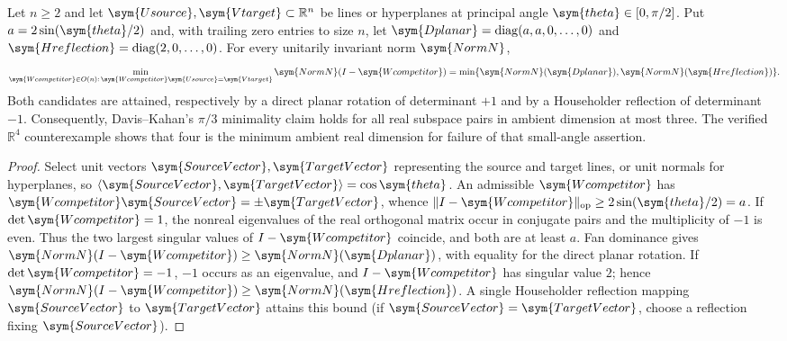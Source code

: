\ifincludeUnformalizedRealTransport
\begin{tcolorbox}[
 enhanced,breakable,colback=white,colframe=red!80!black,
 colbacktitle=red!6!white,coltitle=red!80!black,
 title={Working extension --- real rank-one and codimension-one transport},
 fonttitle=\bfseries,boxrule=1pt,
 left=9pt,right=9pt,top=9pt,bottom=9pt,
 before skip=12pt,after skip=12pt]
\begin{proposition}
Let $n\geq2$ and let $\sym{Usource},\sym{Vtarget}\subset\mathbb R^n$ be lines or hyperplanes
at principal angle $\sym{theta}\in[0,\pi/2]$. Put
$a=2\sin(\sym{theta}/2)$ and, with trailing zero entries to size $n$, let
$\sym{Dplanar}=\operatorname{diag}(a,a,0,\ldots,0)$ and
$\sym{Hreflection}=\operatorname{diag}(2,0,\ldots,0)$. For every unitarily invariant
norm $\sym{NormN}$,
\[
  \min_{\sym{Wcompetitor}\in O(n):\,\sym{Wcompetitor}\sym{Usource}=\sym{Vtarget}} \sym{NormN}(I-\sym{Wcompetitor})
    =\min\{\sym{NormN}(\sym{Dplanar}),\sym{NormN}(\sym{Hreflection})\}.
\]
Both candidates are attained, respectively by a direct planar rotation
of determinant $+1$ and by a Householder reflection of determinant $-1$.
Consequently, Davis--Kahan's $\pi/3$ minimality claim holds for all
real subspace pairs in ambient dimension at most three. The verified
$\mathbb R^4$ counterexample shows that four is the minimum ambient
real dimension for failure of that small-angle assertion.
\end{proposition}
\begin{proof}
Select unit vectors $\sym{SourceVector},\sym{TargetVector}$ representing the source and target lines,
or unit normals for hyperplanes, so $\langle \sym{SourceVector},\sym{TargetVector}\rangle=\cos\sym{theta}$.
An admissible $\sym{Wcompetitor}$ has $\sym{Wcompetitor}\sym{SourceVector}=\pm \sym{TargetVector}$, whence
$\|I-\sym{Wcompetitor}\|_{\rm op}\geq 2\sin(\sym{theta}/2)=a$.
If $\det \sym{Wcompetitor}=1$, the nonreal eigenvalues of the real orthogonal matrix
occur in conjugate pairs and the multiplicity of $-1$ is even.
Thus the two largest singular values of $I-\sym{Wcompetitor}$ coincide, and both are
at least $a$. Fan dominance gives $\sym{NormN}(I-\sym{Wcompetitor})\geq \sym{NormN}(\sym{Dplanar})$, with equality
for the direct planar rotation. If $\det \sym{Wcompetitor}=-1$, $-1$ occurs as an
eigenvalue, and $I-\sym{Wcompetitor}$ has singular value $2$; hence
$\sym{NormN}(I-\sym{Wcompetitor})\geq \sym{NormN}(\sym{Hreflection})$. A single Householder reflection mapping $\sym{SourceVector}$
to $\sym{TargetVector}$ attains this bound (if $\sym{SourceVector}=\sym{TargetVector}$, choose a reflection fixing $\sym{SourceVector}$).

\end{proof}
\end{tcolorbox}
